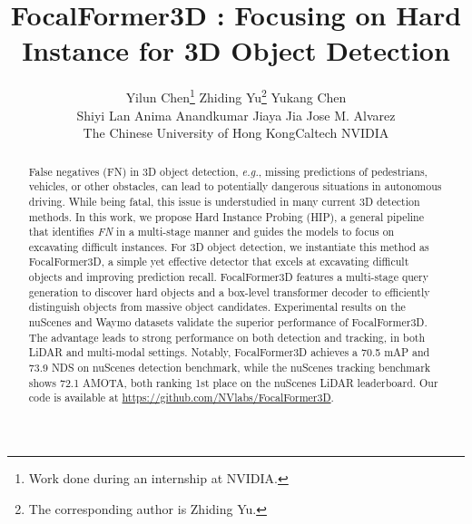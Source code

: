 \documentclass[10pt,twocolumn,letterpaper]{article}
\begin{document}
\title{FocalFormer3D : Focusing on Hard Instance for 3D Object Detection}


\author{Yilun Chen\thanks{Work done during an internship at NVIDIA.} \quad Zhiding Yu\thanks{The corresponding author is Zhiding Yu.} \quad Yukang Chen \quad \\ Shiyi Lan \quad
Anima Anandkumar \quad Jiaya Jia \quad Jose M. Alvarez \\
The Chinese University of Hong Kong\quad Caltech \quad NVIDIA 
}

\maketitle
\ificcvfinal\thispagestyle{empty}\fi

\begin{abstract}
False negatives (FN) in 3D object detection, {\em e.g.}, missing predictions of pedestrians, vehicles, or other obstacles, can lead to potentially dangerous situations in autonomous driving. While being fatal, this issue is understudied in many current 3D detection methods. In this work, we propose Hard Instance Probing (HIP), a general pipeline that identifies \textit{FN} in a multi-stage manner and guides the models to focus on excavating difficult instances. For 3D object detection, we instantiate this method as FocalFormer3D, a simple yet effective detector that excels at excavating difficult objects and improving prediction recall. FocalFormer3D features a multi-stage query generation to discover hard objects and a box-level transformer decoder to efficiently distinguish objects from massive object candidates. Experimental results on the nuScenes and Waymo datasets validate the superior performance of FocalFormer3D. The advantage leads to strong performance on both detection and tracking, in both LiDAR and multi-modal settings. Notably, FocalFormer3D achieves a 70.5 mAP and 73.9 NDS on nuScenes detection benchmark, while the nuScenes tracking benchmark shows 72.1 AMOTA, both ranking 1st place on the nuScenes LiDAR leaderboard.
Our code is available at \url{https://github.com/NVlabs/FocalFormer3D}.

\end{abstract}
\end{document}
